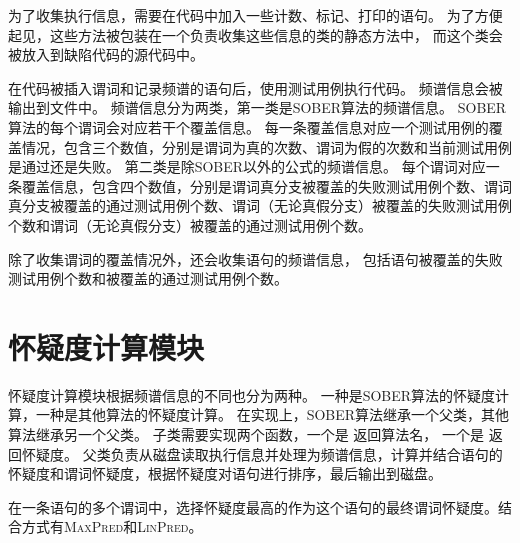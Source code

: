 为了收集执行信息，需要在代码中加入一些计数、标记、打印的语句。
为了方便起见，这些方法被包装在一个负责收集这些信息的类的静态方法中，
而这个类会被放入到缺陷代码的源代码中。

在代码被插入谓词和记录频谱的语句后，使用测试用例执行代码。
频谱信息会被输出到文件中。
频谱信息分为两类，第一类是SOBER算法的频谱信息。
SOBER算法的每个谓词会对应若干个覆盖信息。
每一条覆盖信息对应一个测试用例的覆盖情况，包含三个数值，分别是谓词为真的次数、谓词为假的次数和当前测试用例是通过还是失败。
第二类是除SOBER以外的公式的频谱信息。
每个谓词对应一条覆盖信息，包含四个数值，分别是谓词真分支被覆盖的失败测试用例个数、谓词真分支被覆盖的通过测试用例个数、谓词（无论真假分支）被覆盖的失败测试用例个数和谓词（无论真假分支）被覆盖的通过测试用例个数。

除了收集谓词的覆盖情况外，还会收集语句的频谱信息，
包括语句被覆盖的失败测试用例个数和被覆盖的通过测试用例个数。

\section{怀疑度计算模块}

怀疑度计算模块根据频谱信息的不同也分为两种。
一种是SOBER算法的怀疑度计算，一种是其他算法的怀疑度计算。
在实现上，SOBER算法继承一个父类，其他算法继承另一个父类。
子类需要实现两个函数，一个是  返回算法名，
一个是  返回怀疑度。
父类负责从磁盘读取执行信息并处理为频谱信息，计算并结合语句的怀疑度和谓词怀疑度，根据怀疑度对语句进行排序，最后输出到磁盘。

在一条语句的多个谓词中，选择怀疑度最高的作为这个语句的最终谓词怀疑度。结合方式有\textsc{MaxPred}和\textsc{LinPred}。


